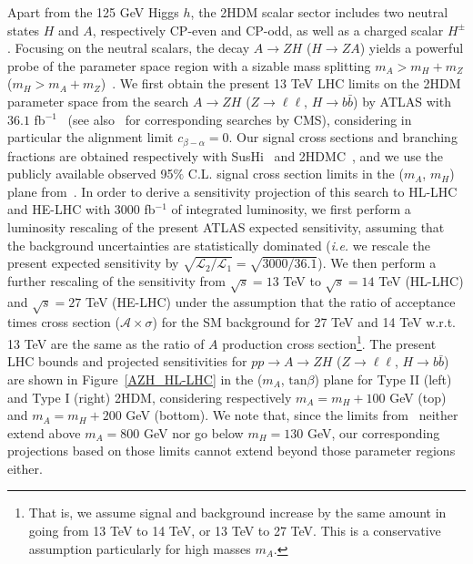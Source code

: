 Apart from the 125 GeV Higgs $h$, the 2HDM scalar sector includes two neutral states 
$H$ and $A$, respectively CP-even and CP-odd, as well as a charged scalar $H^{\pm}$.
Focusing on the neutral scalars, the decay $A \to Z H$ ($H \to Z A$) yields a powerful probe of the parameter space region with a sizable mass splitting $m_A > m_H + m_Z$ ($m_H > m_A + m_Z$)~\cite{Coleppa:2014hxa,Dorsch:2014qja}. We first obtain the present 13 TeV LHC limits on the 2HDM parameter space from the search $A \to Z H$ ($Z\to \ell\ell$, $H \to b\bar{b}$) by ATLAS with $36.1$ fb$^{-1}$~\cite{Aaboud:2018eoy} (see also~\cite{Khachatryan:2016are,CMS:2016qxc} for 
corresponding searches by CMS), considering in particular the alignment limit $c_{\beta -\alpha} = 0$.
Our signal cross sections and branching fractions are obtained respectively with {\sc SusHi}~\cite{Harlander:2012pb} and {\sc 2HDMC}~\cite{Eriksson:2009ws}, and we use the 
publicly available observed 95$\%$ C.L. signal cross section limits in the ($m_A$, $m_H$) plane from~\cite{Aaboud:2018eoy}. In order to derive a sensitivity projection of this search to HL-LHC and HE-LHC with $3000$ fb$^{-1}$ of integrated luminosity, we first perform a luminosity rescaling of the present ATLAS expected sensitivity, assuming that the background uncertainties are statistically dominated ({\it i.e.} we rescale the present expected sensitivity by $\sqrt{\mathcal{L}_2/\mathcal{L}_1} = \sqrt{3000/36.1}$).
We then perform a further rescaling of the sensitivity from $\sqrt{s} = 13$ TeV to 
$\sqrt{s} = 14$ TeV (HL-LHC) and $\sqrt{s} = 27$ TeV (HE-LHC) under the assumption that the
ratio of acceptance times cross section ($\mathcal{A} \times \sigma$) for the SM background for 27 TeV and 14 TeV w.r.t. 13 TeV are the same as the ratio of $A$ production cross section\footnote{That is, we assume signal and background increase by the same amount in going from 13 TeV to 14 TeV, or 13 TeV to 27 TeV. This is a conservative assumption particularly for high masses $m_A$.}. 
The present LHC bounds and projected sensitivities for $p p \to A \to Z H$ ($Z\to \ell\ell$, $H \to b\bar{b}$) are shown in Figure~\ref{AZH_HL-LHC} in the ($m_A$, $\mathrm{tan}\beta$) plane for Type II (left) and Type I (right) 2HDM, considering respectively $m_A = m_H + 100$ GeV (top) and $m_A = m_H + 200$ GeV (bottom).
We note that, since the limits from~\cite{Aaboud:2018eoy} neither extend above 
$m_A = 800$ GeV nor go below $m_H = 130$ GeV, our corresponding projections based on those limits cannot 
extend beyond those parameter regions either.  

